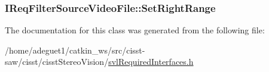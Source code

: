 \hypertarget{class_i_req_filter_source_video_file_a58296d3697fcada0a84c8c67bebdcf11}{
\subsubsection[{Set\-Right\-Range}]{ I\-Req\-Filter\-Source\-Video\-File\-::\-Set\-Right\-Range}}\label{class_i_req_filter_source_video_file_a58296d3697fcada0a84c8c67bebdcf11}


The documentation for this class was generated from the following file\-:\begin{DoxyCompactItemize}
\item 
/home/adeguet1/catkin\-\_\-ws/src/cisst-\/saw/cisst/cisst\-Stereo\-Vision/\hyperlink{svl_required_interfaces_8h}{svl\-Required\-Interfaces.\-h}\end{DoxyCompactItemize}
